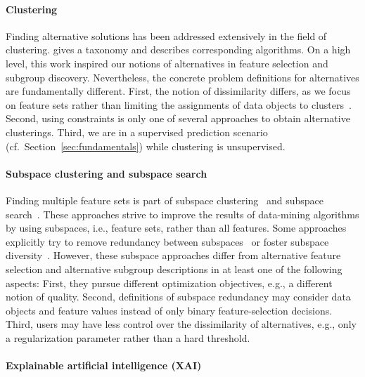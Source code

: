 \paragraph{Clustering}

Finding alternative solutions has been addressed extensively in the field of clustering. \cite{bailey2014alternative} gives a taxonomy and describes corresponding algorithms.
On a high level, this work inspired our notions of alternatives in feature selection and subgroup discovery.
Nevertheless, the concrete problem definitions for alternatives are fundamentally different.
First, the notion of dissimilarity differs, as we focus on feature sets rather than limiting the assignments of data objects to clusters~\cite{bae2006coala, bae2010clustering}.
Second, using constraints is only one of several approaches to obtain alternative clusterings.
Third, we are in a supervised prediction scenario (cf.~Section~\ref{sec:fundamentals}) while clustering is unsupervised.

\paragraph{Subspace clustering and subspace search}

Finding multiple feature sets is part of subspace clustering~\cite{gunnemann2009detection, hu2018subspace, mueller2009relevant} and subspace search~\cite{fouche2021efficient, nguyen20134s, trittenbach2019dimension}.
These approaches strive to improve the results of data-mining algorithms by using subspaces, i.e., feature sets, rather than all features.
Some approaches explicitly try to remove redundancy between subspaces~\cite{gunnemann2009detection, hu2018subspace, nguyen20134s} or foster subspace diversity~\cite{fouche2021efficient, trittenbach2019dimension}.
However, these subspace approaches differ from alternative feature selection and alternative subgroup descriptions in at least one of the following aspects:
First, they pursue different optimization objectives, e.g., a different notion of quality.
Second, definitions of subspace redundancy may consider data objects and feature values instead of only binary feature-selection decisions.
Third, users may have less control over the dissimilarity of alternatives, e.g., only a regularization parameter rather than a hard threshold.

\paragraph{Explainable artificial intelligence (XAI)}

